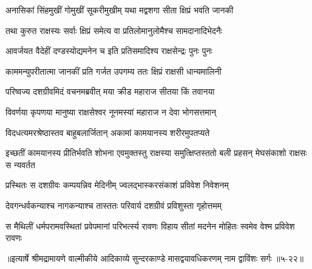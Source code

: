 \twolineshloka
{अनासिकां सिंहमुखीं गोमुखीं सूकरीमुखीम्}
{यथा मद्वशगा सीता क्षिप्रं भवति जानकी} %

\twolineshloka
{तथा कुरुत राक्षस्यः सर्वाः क्षिप्रं समेत्य वा}
{प्रतिलोमानुलोमैश्च सामदानादिभेदनैः} %

\twolineshloka
{आवर्जयत वैदेहीं दण्डस्योद्यमनेन च}
{इति प्रतिसमादिश्य राक्षसेन्द्रः पुनः पुनः} %

\twolineshloka
{काममन्युपरीतात्मा जानकीं प्रति गर्जत}
{उपगम्य ततः क्षिप्रं राक्षसी धान्यमालिनी} %

\twolineshloka
{परिष्वज्य दशग्रीवमिदं वचनमब्रवीत्}
{मया क्रीड महाराज सीतया किं तवानया} %

\twolineshloka
{विवर्णया कृपणया मानुष्या राक्षसेश्वर}
{नूनमस्यां महाराज न देवा भोगसत्तमान्} %

\twolineshloka
{विदधत्यमरश्रेष्ठास्तव बाहुबलार्जितान्}
{अकामां कामयानस्य शरीरमुपतप्यते} %

\threelineshloka
{इच्छतीं कामयानस्य प्रीतिर्भवति शोभना}
{एवमुक्तस्तु राक्षस्या समुत्क्षिप्तस्ततो बली}
{प्रहसन् मेघसंकाशो राक्षसः स न्यवर्तत} %

\twolineshloka
{प्रस्थितः स दशग्रीवः कम्पयन्निव मेदिनीम्}
{ज्वलद्भास्करसंकाशं प्रविवेश निवेशनम्} %

\twolineshloka
{देवगन्धर्वकन्याश्च नागकन्याश्च तास्ततः}
{परिवार्य दशग्रीवं प्रविशुस्ता गृहोत्तमम्} %

\twolineshloka
{स मैथिलीं धर्मपरामवस्थितां प्रवेपमानां परिभर्त्स्य रावणः}
{विहाय सीतां मदनेन मोहितः स्वमेव वेश्म प्रविवेश रावणः} %


॥इत्यार्षे श्रीमद्रामायणे वाल्मीकीये आदिकाव्ये सुन्दरकाण्डे मासद्वयावधिकरणम् नाम द्वाविंशः सर्गः ॥५-२२॥
